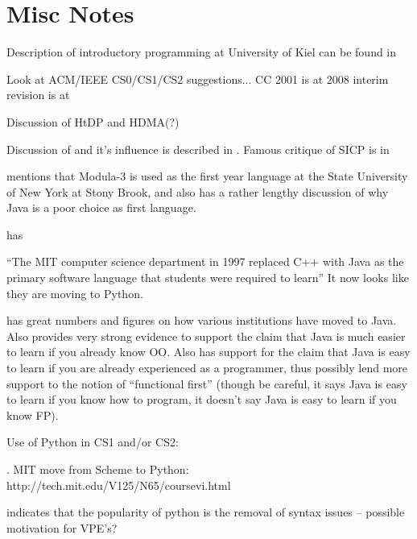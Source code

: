 \label{chapter:problem}

\newlength{\savedunitlength}
\setlength{\unitlength}{2em}


\setlength{\unitlength}{\savedunitlength}

\section{Misc Notes}

Description of introductory programming at University of Kiel can be found in \cite{Huch05}

Look at ACM/IEEE CS0/CS1/CS2 suggestions...  CC 2001 is at \cite{cc2001} 2008 interim revision is at \cite{cs2008}

Discussion of HtDP and HDMA(?)

Discussion of \cite{SICPbook} and it's influence is described in \cite{Flatt04}.  Famous critique of SICP is in \cite{Wadler87}

\cite{Bos98} mentions that Modula-3 is used as the first year language at the State University of New York at Stony Brook, and also has a rather lengthy discussion of why Java is a poor choice as first language.

\cite{Mahmoud04} has 


``The MIT computer science department in 1997 replaced C++ with Java as the primary software language that students were required to learn'' \cite{Benander04}  It now looks like they are moving to Python.

\cite{Benander04} has great numbers and figures on how various institutions have moved to Java.  Also provides very strong evidence to support the claim that Java is much easier to learn if you already know OO.  Also has support for the claim that Java is easy to learn if you are already experienced as a programmer, thus possibly lend more support to the notion of ``functional first'' (though be careful, it says Java is easy to learn if you know how to program, it doesn't say Java is easy to learn if you know FP).


Use of Python in CS1 and/or CS2:

\cite{Radenski06,Shannon03,Agarwal05,Agarwal08}.  MIT move from Scheme to Python: http://tech.mit.edu/V125/N65/coursevi.html

\cite{Necaise08} indicates that the popularity of python is the removal of syntax issues -- possible motivation for VPE's?